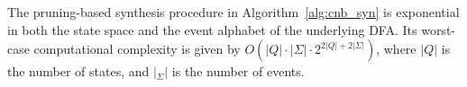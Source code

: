 \documentclass[twocolumn]{autart}
\newtheorem{mypro}{\bf Proposition}
\begin{document}
%
%

The pruning-based synthesis procedure in Algorithm~\ref{alg:cnb_syn} is exponential in both the state space and the event alphabet of the underlying DFA.
Its worst-case computational complexity is given by
$O(|Q|\cdot |\Sigma|\cdot 2^{2|Q|+2|\Sigma|})$, where $|Q|$ is the number of states, and $|_\Sigma|$ is the number of events.
\end{document}

